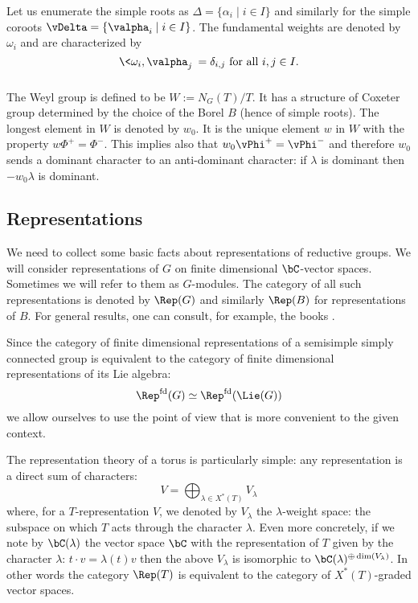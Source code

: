 \documentclass[reqno, 10pt]{amsart}
\theoremstyle{plain}
\theoremstyle{definition}
\numberwithin{equation}{section}%
\begin{document}
Let us enumerate the simple roots as $\Delta = \{\alpha_i\mid i\in I\}$ and similarly for the simple coroots $\vDelta = \{\valpha_i\mid i\in I\}$.
The fundamental weights are denoted by $\omega_i$ and are characterized by 
\[\<\omega_i, \valpha_j\> = \delta_{i,j} \text{ for all } i,j\in I.\]

\subsubsection{} The Weyl group is defined to be $W:=N_G(T)/T$. It has a structure of Coxeter group determined by the choice of the Borel $B$ (hence of simple roots). The longest element in $W$ is denoted by $w_0$.
It is the unique element $w$ in $W$ with the property $w\Phi^+=\Phi^-$. This implies also that $w_0\vPhi^+=\vPhi^-$ and therefore $w_0$ sends a dominant character to an anti-dominant character: if $\lambda$ is dominant then $-w_0\lambda$ is dominant.



\subsection{Representations}
We need to collect some basic facts about representations of reductive groups.
We will consider representations of $G$ on finite dimensional $\bC$-vector spaces. Sometimes we will refer to them as $G$-modules.
The category of all such representations is denoted by $\Rep(G)$ and
similarly $\Rep(B)$ for representations of $B$. For general results, one can consult, for example, the books \cite{jantzen2003representations,humphreys2012introduction,fulton2013representation}.

Since the category of finite dimensional representations of a semisimple simply connected group is equivalent to the category of finite dimensional representations of its Lie algebra:
\[ \Rep^{\text{fd}}(G)\simeq \Rep^{\text{fd}}(\Lie(G))\]
we allow ourselves to use the point of view that is more convenient to the given context.


The representation theory of a torus is particularly simple: any representation is a direct sum of characters:
\[ V = \bigoplus_{\lambda\in X^*(T)} V_\lambda \]
where, for a $T$-representation $V$, we denoted by $V_\lambda$ the $\lambda$-weight space: the subspace on which $T$ acts through the character $\lambda$. 
Even more concretely, if we note by $\bC(\lambda)$ the vector space $\bC$ with the representation of $T$ given by the character $\lambda$: $t\cdot v = \lambda(t)v$ then the above $V_\lambda$ is isomorphic to $\bC(\lambda)^{\oplus \dim(V_\lambda)}$.
In other words the category $\Rep(T)$ is equivalent to the category of $X^*(T)$-graded vector spaces.
\end{document}
